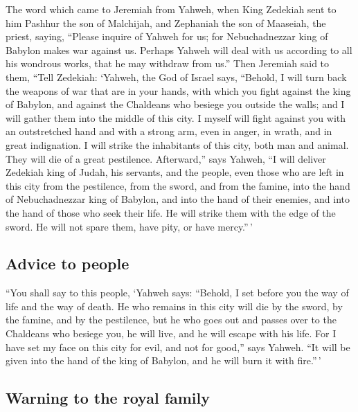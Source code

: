 \begin{paracol}{2}
\begin{otherlanguage}{english}
 The word which came to Jeremiah from Yahweh, when King
Zedekiah sent to him Pashhur the son of Malchijah, and Zephaniah the son
of Maaseiah, the priest, saying,  ``Please inquire of
Yahweh for us; for Nebuchadnezzar king of Babylon makes war against us.
Perhaps Yahweh will deal with us according to all his wondrous works,
that he may withdraw from us.''  Then Jeremiah said to
them, ``Tell Zedekiah:  `Yahweh, the God of Israel says,
``Behold, I will turn back the weapons of war that are in your hands,
with which you fight against the king of Babylon, and against the
Chaldeans who besiege you outside the walls; and I will gather them into
the middle of this city.  I myself will fight against you
with an outstretched hand and with a strong arm, even in anger, in
wrath, and in great indignation.  I will strike the
inhabitants of this city, both man and animal. They will die of a great
pestilence.  Afterward,'' says Yahweh, ``I will deliver
Zedekiah king of Judah, his servants, and the people, even those who are
left in this city from the pestilence, from the sword, and from the
famine, into the hand of Nebuchadnezzar king of Babylon, and into the
hand of their enemies, and into the hand of those who seek their life.
He will strike them with the edge of the sword. He will not spare them,
have pity, or have mercy.''\,'

\hypertarget{advice-to-people}{%
\subsection{Advice to people}\label{advice-to-people}}

 ``You shall say to this people, `Yahweh says: ``Behold, I
set before you the way of life and the way of death.  He
who remains in this city will die by the sword, by the famine, and by
the pestilence, but he who goes out and passes over to the Chaldeans who
besiege you, he will live, and he will escape with his life.
 For I have set my face on this city for evil, and not
for good,'' says Yahweh. ``It will be given into the hand of the king of
Babylon, and he will burn it with fire.''\,'

\hypertarget{warning-to-the-royal-family}{%
\subsection{Warning to the royal
family}\label{warning-to-the-royal-family}}


\end{otherlanguage}
\end{paracol}
